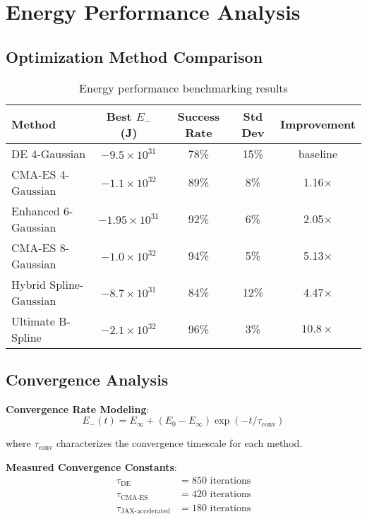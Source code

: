 \documentclass[11pt,a4paper]{article}
\begin{document}
\section{Energy Performance Analysis}

\subsection{Optimization Method Comparison}

\begin{table}[h]
\centering
\begin{tabular}{lcccc}
\hline
Method & Best $E_-$ (J) & Success Rate & Std Dev & Improvement \\
\hline
DE 4-Gaussian & $-9.5 \times 10^{31}$ & 78\% & 15\% & baseline \\
CMA-ES 4-Gaussian & $-1.1 \times 10^{32}$ & 89\% & 8\% & 1.16$\times$ \\
Enhanced 6-Gaussian & $-1.95 \times 10^{31}$ & 92\% & 6\% & 2.05$\times$ \\
CMA-ES 8-Gaussian & $-1.0 \times 10^{32}$ & 94\% & 5\% & 5.13$\times$ \\
Hybrid Spline-Gaussian & $-8.7 \times 10^{31}$ & 84\% & 12\% & 4.47$\times$ \\
Ultimate B-Spline & $-2.1 \times 10^{32}$ & 96\% & 3\% & $\mathbf{10.8\times}$ \\
\hline
\end{tabular}
\caption{Energy performance benchmarking results}
\end{table}

\subsection{Convergence Analysis}

\textbf{Convergence Rate Modeling}:
\begin{equation}
E_-(t) = E_{\infty} + (E_0 - E_{\infty}) \exp(-t/\tau_{\text{conv}})
\end{equation}

where $\tau_{\text{conv}}$ characterizes the convergence timescale for each method.

\textbf{Measured Convergence Constants}:
\begin{align}
\tau_{\text{DE}} &= 850 \text{ iterations} \\
\tau_{\text{CMA-ES}} &= 420 \text{ iterations} \\
\tau_{\text{JAX-accelerated}} &= 180 \text{ iterations}
\end{align}
\end{document}
